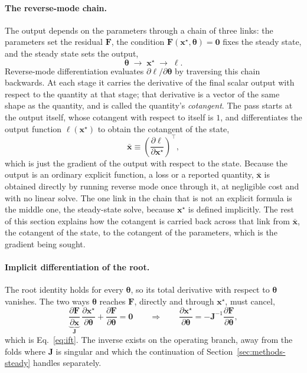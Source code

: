 \documentclass{article}
\begin{document}
\paragraph{The reverse-mode chain.} The output depends on the parameters through a chain of three links: the parameters set the residual \(\mathbf{F}\), the condition \(\mathbf{F}(\mathbf{x}^\star,\boldsymbol{\theta})=\mathbf{0}\) fixes the steady state, and the steady state sets the output,
\[
\boldsymbol{\theta}\;\longrightarrow\;\mathbf{x}^\star\;\longrightarrow\;\ell .
\]
Reverse-mode differentiation evaluates \(\partial\ell/\partial\boldsymbol{\theta}\) by traversing this chain backwards. At each stage it carries the derivative of the final scalar output with respect to the quantity at that stage; that derivative is a vector of the same shape as the quantity, and is called the quantity's \emph{cotangent}. The pass starts at the output itself, whose cotangent with respect to itself is \(1\), and differentiates the output function \(\ell(\mathbf{x}^\star)\) to obtain the cotangent of the state,
\[
\bar{\mathbf{x}}\equiv\left(\frac{\partial\ell}{\partial\mathbf{x}^\star}\right)^{\!\top},
\]
which is just the gradient of the output with respect to the state. Because the output is an ordinary explicit function, a loss or a reported quantity, \(\bar{\mathbf{x}}\) is obtained directly by running reverse mode once through it, at negligible cost and with no linear solve. The one link in the chain that is not an explicit formula is the middle one, the steady-state solve, because \(\mathbf{x}^\star\) is defined implicitly. The rest of this section explains how the cotangent is carried back across that link from \(\bar{\mathbf{x}}\), the cotangent of the state, to the cotangent of the parameters, which is the gradient being sought.

\paragraph{Implicit differentiation of the root.} The root identity holds for every \(\boldsymbol{\theta}\), so its total derivative with respect to \(\boldsymbol{\theta}\) vanishes. The two ways \(\boldsymbol{\theta}\) reaches \(\mathbf{F}\), directly and through \(\mathbf{x}^\star\), must cancel,
\[
\underbrace{\frac{\partial\mathbf{F}}{\partial\mathbf{x}}}_{\displaystyle \mathbf{J}}\,
\frac{\partial\mathbf{x}^\star}{\partial\boldsymbol{\theta}}
+\frac{\partial\mathbf{F}}{\partial\boldsymbol{\theta}}=\mathbf{0}
\qquad\Longrightarrow\qquad
\frac{\partial\mathbf{x}^\star}{\partial\boldsymbol{\theta}}
=-\mathbf{J}^{-1}\frac{\partial\mathbf{F}}{\partial\boldsymbol{\theta}},
\]
which is Eq.~\eqref{eq:ift}. The inverse exists on the operating branch, away from the folds where \(\mathbf{J}\) is singular and which the continuation of Section~\ref{sec:methods-steady} handles separately.
\end{document}
